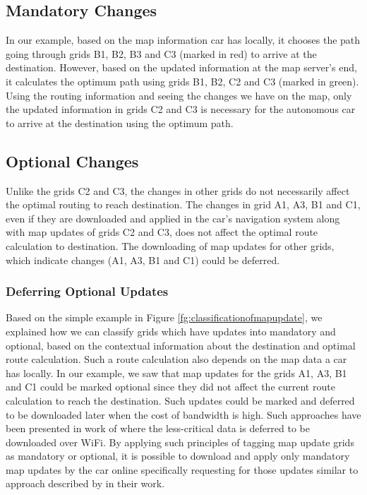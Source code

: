 \subsection{Mandatory Changes}
In our example, based on the map information car has locally, it chooses the path going through grids B1, B2, B3 and C3 (marked in red) to arrive at the destination. However, based on the updated information at the map server's end, it calculates the optimum path using grids B1, B2, C2 and C3 (marked in green). Using the routing information and seeing the changes we have on the map, only the updated information in grids C2 and C3 is necessary for the autonomous car to arrive at the destination using the optimum path. 
\subsection{Optional Changes}
Unlike the grids C2 and C3, the changes in other grids do not necessarily affect the optimal routing to reach destination. The changes in grid A1, A3, B1 and C1, even if they are downloaded and applied in the car's navigation system along with map updates of grids C2 and C3, does not affect the optimal route calculation to destination. The downloading of map updates for other grids, which indicate changes (A1, A3, B1 and C1) could be deferred. 
\subsubsection{Deferring Optional Updates}
Based on the simple example in Figure \ref{fg:classificationofmapupdate}, we explained how we can classify grids which have updates into mandatory and optional, based on the contextual information about the destination and optimal route calculation. Such a route calculation also depends on the map data a car has locally. In our example, we saw that map updates for the grids A1, A3, B1 and C1 could be marked optional since they did not affect the current route calculation to reach the destination. Such updates could be marked and deferred to be downloaded later when the cost of bandwidth is high. Such approaches have been presented in work of \citet{balasubramanian2010augmenting} where the less-critical data is deferred to be downloaded over WiFi. By applying such principles of tagging map update grids as mandatory or optional, it is possible to download and apply only mandatory map updates by the car online specifically requesting for those updates similar to approach described by \citet{min2011system} in their work. \\

